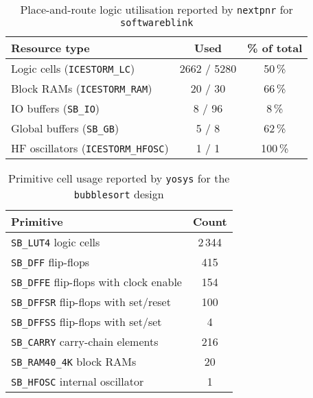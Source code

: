\documentclass[a4paper,10pt]{article}
\begin{document}
\begin{table}[H]
    \centering
    \begin{tabularx}{0.6\textwidth}{X c c}
        \toprule
        Resource type & Used & \% of total \\ \midrule
        Logic cells (\texttt{ICESTORM\_LC}) & 2662 / 5280 & 50\,\% \\
        Block RAMs (\texttt{ICESTORM\_RAM})& 20 / 30 & 66\,\% \\
        IO buffers (\texttt{SB\_IO}) & 8 / 96 & 8\,\% \\
        Global buffers (\texttt{SB\_GB}) & 5 / 8 & 62\,\% \\
        HF oscillators (\texttt{ICESTORM\_HFOSC}) & 1 / 1 & 100\,\% \\
        \bottomrule
    \end{tabularx}
    \caption{Place-and-route logic utilisation reported by 
    \texttt{nextpnr} for \texttt{softwareblink}}
    \label{tab:software_pnr_report}
\end{table}

\begin{table}[H]
    \centering
    \begin{tabular}{|l|c|}
        \hline
        \textbf{Primitive} & \textbf{Count} \\
        \hline
        \texttt{SB\_LUT4} logic cells & 2\,344 \\
        \texttt{SB\_DFF} flip-flops & 415 \\
        \texttt{SB\_DFFE} flip-flops with clock enable & 154 \\
        \texttt{SB\_DFFSR} flip-flops with set/reset & 100 \\
        \texttt{SB\_DFFSS} flip-flops with set/set & 4 \\
        \texttt{SB\_CARRY} carry-chain elements & 216 \\
        \texttt{SB\_RAM40\_4K} block RAMs & 20 \\
        \texttt{SB\_HFOSC} internal oscillator & 1 \\
        \hline
    \end{tabular}
    \caption{Primitive cell usage reported by 
    \texttt{yosys} for the \texttt{bubblesort} design}
    \label{tab:bubblesort_yosys_report}
\end{table}
\end{document}
